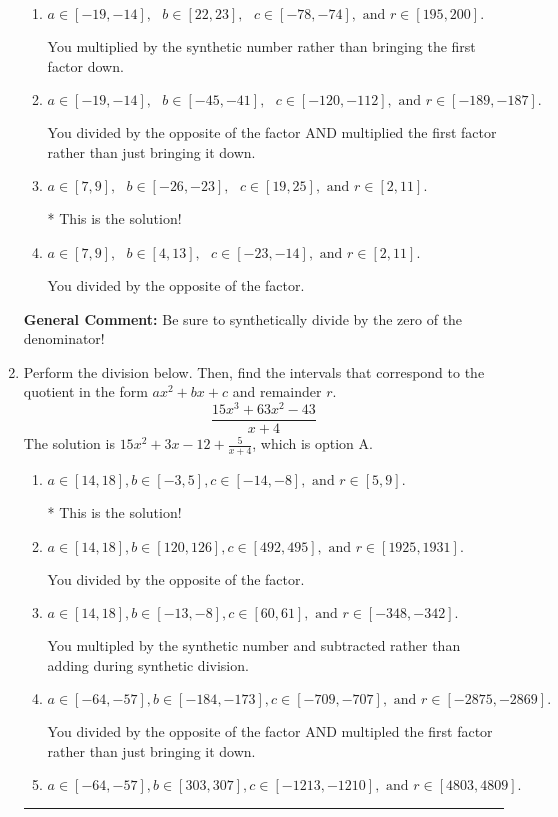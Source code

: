 \documentclass{extbook}[14pt]
\newcommand{\litem}[1]{\item #1

\rule{\textwidth}{0.4pt}}
\begin{document}
\begin{enumerate}
{\begin{enumerate}[label=\Alph*.]
 You multiplied by the synthetic number and subtracted rather than adding during synthetic division.
\item \( a \in [-19, -14], \text{   } b \in [22, 23], \text{   } c \in [-78, -74], \text{   and   } r \in [195, 200]. \)

 You multiplied by the synthetic number rather than bringing the first factor down.
\item \( a \in [-19, -14], \text{   } b \in [-45, -41], \text{   } c \in [-120, -112], \text{   and   } r \in [-189, -187]. \)

 You divided by the opposite of the factor AND multiplied the first factor rather than just bringing it down.
\item \( a \in [7, 9], \text{   } b \in [-26, -23], \text{   } c \in [19, 25], \text{   and   } r \in [2, 11]. \)

* This is the solution!
\item \( a \in [7, 9], \text{   } b \in [4, 13], \text{   } c \in [-23, -14], \text{   and   } r \in [2, 11]. \)

 You divided by the opposite of the factor.
\end{enumerate}

\textbf{General Comment:} Be sure to synthetically divide by the zero of the denominator!
}
\litem{
Perform the division below. Then, find the intervals that correspond to the quotient in the form $ax^2+bx+c$ and remainder $r$.
\[ \frac{15x^{3} +63 x^{2} -43}{x + 4} \]The solution is \( 15x^{2} +3 x -12 + \frac{5}{x + 4} \), which is option A.\begin{enumerate}[label=\Alph*.]
\item \( a \in [14, 18], b \in [-3, 5], c \in [-14, -8], \text{ and } r \in [5, 9]. \)

* This is the solution!
\item \( a \in [14, 18], b \in [120, 126], c \in [492, 495], \text{ and } r \in [1925, 1931]. \)

 You divided by the opposite of the factor.
\item \( a \in [14, 18], b \in [-13, -8], c \in [60, 61], \text{ and } r \in [-348, -342]. \)

 You multipled by the synthetic number and subtracted rather than adding during synthetic division.
\item \( a \in [-64, -57], b \in [-184, -173], c \in [-709, -707], \text{ and } r \in [-2875, -2869]. \)

 You divided by the opposite of the factor AND multipled the first factor rather than just bringing it down.
\item \( a \in [-64, -57], b \in [303, 307], c \in [-1213, -1210], \text{ and } r \in [4803, 4809]. \)


\end{enumerate}}
\end{enumerate}
\end{document}
